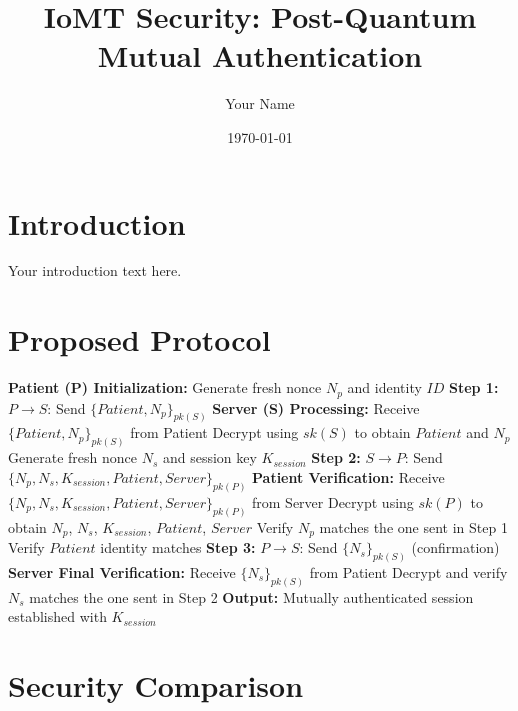 \documentclass{article}
\title{IoMT Security: Post-Quantum Mutual Authentication}
\author{Your Name}
\date{\today}
\begin{document}
\maketitle

\section{Introduction}
Your introduction text here.

\section{Proposed Protocol}

\begin{algorithm}[H]
\caption{PQC-MFA Authentication Protocol (Enhanced Secure Version)}
\label{alg:pqc-mfa}
\begin{algorithmic}[1]
\State \textbf{Patient (P) Initialization:}
\State Generate fresh nonce $N_p$ and identity $ID$
\State \textbf{Step 1:} $P \rightarrow S$: Send $\{Patient, N_p\}_{pk(S)}$
\State
\State \textbf{Server (S) Processing:}
\State Receive $\{Patient, N_p\}_{pk(S)}$ from Patient
\State Decrypt using $sk(S)$ to obtain $Patient$ and $N_p$
\State Generate fresh nonce $N_s$ and session key $K_{session}$
\State \textbf{Step 2:} $S \rightarrow P$: Send $\{N_p, N_s, K_{session}, Patient, Server\}_{pk(P)}$
\State
\State \textbf{Patient Verification:}
\State Receive $\{N_p, N_s, K_{session}, Patient, Server\}_{pk(P)}$ from Server
\State Decrypt using $sk(P)$ to obtain $N_p$, $N_s$, $K_{session}$, $Patient$, $Server$
\State Verify $N_p$ matches the one sent in Step 1
\State Verify $Patient$ identity matches
\State \textbf{Step 3:} $P \rightarrow S$: Send $\{N_s\}_{pk(S)}$ (confirmation)
\State
\State \textbf{Server Final Verification:}
\State Receive $\{N_s\}_{pk(S)}$ from Patient
\State Decrypt and verify $N_s$ matches the one sent in Step 2
\State \textbf{Output:} Mutually authenticated session established with $K_{session}$
\end{algorithmic}
\end{algorithm}

\section{Security Comparison}
\end{document}
